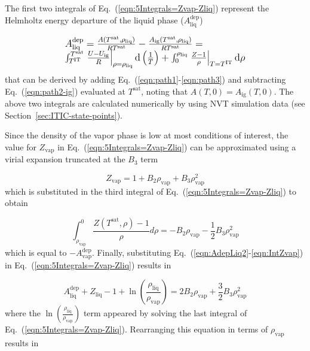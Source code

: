 \documentclass[5p,times]{elsarticle}
\begin{document}
The first two integrals of Eq.~(\ref{eqn:5Integrals=Zvap-Zliq}) represent the Helmholtz energy departure of the liquid phase ($A^\mathrm{dep}_\mathrm{liq}$)

\begin{equation}
\begingroup
\large
\begin{array}{l}
A^\mathrm{dep}_\mathrm{liq} = \frac{A(T^\mathrm{sat},\rho_\mathrm{liq})}{RT^\mathrm{sat}} - \frac{A_\mathrm{ig}(T^\mathrm{sat},\rho_\mathrm{liq})}{RT^\mathrm{sat}}
= 
\\
\int _{T^{\mathrm{IT}}}^{T^{\mathrm{\mathrm{sat}}}
} \left. \frac{U-U_\mathrm{ig}}{R} \right\vert_{\rho=\rho_{\mathrm{liq}}} \mathrm{d} \left(\frac{1}{T} \right) + \int _{0}^{\rho _{\mathrm{liq}} } \left. \frac{Z-1}{\rho } \right\vert_{T=T^{\mathrm{IT}}} \mathrm{d}\rho   
\end{array} 
\endgroup
\label{eqn:AdepLiq2}
\end{equation}
that can be derived by adding Eq.~(\ref{eqn:path1}-\ref{eqn:path3}) and subtracting Eq.~(\ref{eqn:path2-ig}) evaluated at $T^\mathrm{sat}$, noting that $A(T,0)=A_\mathrm{ig}(T,0)$. The above two integrals are calculated numerically by using NVT simulation data (see Section~\ref{sec:ITIC-state-points}).

Since the density of the vapor phase is low at most conditions of interest, the value for $Z_{\mathrm{vap}}$ in Eq.~(\ref{eqn:5Integrals=Zvap-Zliq}) can be approximated using a virial expansion truncated at the $B_3$ term

\begin{equation}
{Z_{\mathrm{vap}}} = 1 + {B_2}{\rho_{\mathrm{vap}}} + {B_3}\rho_{\mathrm{vap}}^2
\label{eqn:Zvap}
\end{equation}
which is substituted in the third integral of Eq.~(\ref{eqn:5Integrals=Zvap-Zliq}) to obtain

\begin{equation}
\int _{\rho_\mathrm{vap}}^{0} \frac{Z(T^\mathrm{sat},\rho)-1}{\rho}  d\rho = -B_2\rho_\mathrm{vap}-\frac{1}{2}B_3\rho_\mathrm{vap}^2
\label{eqn:IntZvap}
\end{equation}
which is equal to $-A^\mathrm{dep}_\mathrm{vap}$. Finally, substituting Eq.~(\ref{eqn:AdepLiq2}-\ref{eqn:IntZvap}) in Eq.~(\ref{eqn:5Integrals=Zvap-Zliq}) results in

\begin{equation}
A^\mathrm{dep}_\mathrm{liq}
+ {Z_{\mathrm{liq}}} - 1 + \ln \left( \frac{{{\rho _{\mathrm{liq}}}}}{{{\rho _{\mathrm{vap}}}}} \right) = 2{B_2} {\rho _{\mathrm{vap}}} + \frac{3}{2}{B_3} \rho _{\mathrm{vap}}^2 
\label{eqn:eqn14}
\end{equation}
where the $\ln \left( \frac{{{\rho _{\mathrm{liq}}}}}{{{\rho _{\mathrm{vap}}}}} \right)$ term appeared by solving the last integral of Eq.~(\ref{eqn:5Integrals=Zvap-Zliq}). Rearranging this equation in terms of ${\rho_\mathrm{vap}}$ results in
\end{document}
